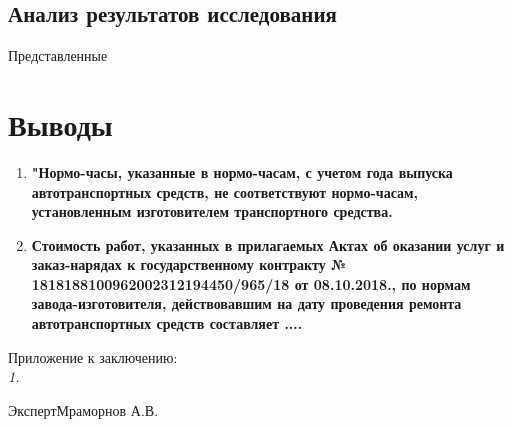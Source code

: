 \subsection{Анализ результатов исследования}

Представленные 

\section{Выводы}


\begin{enumerate}
	\item 
	\textbf{"Нормо-часы, указанные в  нормо-часам, с учетом года выпуска автотранспортных средств, не соответствуют нормо-часам, установленным   изготовителем транспортного средства.}
	\item 
	\textbf{Стоимость работ, указанных в прилагаемых Актах об оказании услуг и заказ-нарядах к государственному контракту  № 1818188100962002312194450/965/18 от 08.10.2018., по нормам завода-изготовителя, действовавшим на дату проведения ремонта автотранспортных средств составляет ....}
\end{enumerate}

\vspace{15mm}
\relax
Приложение к заключению:\\
\textit{
	1.
	   }

\vspace{20mm}

{Эксперт}\hfill           {Мраморнов А.В.}

%
%